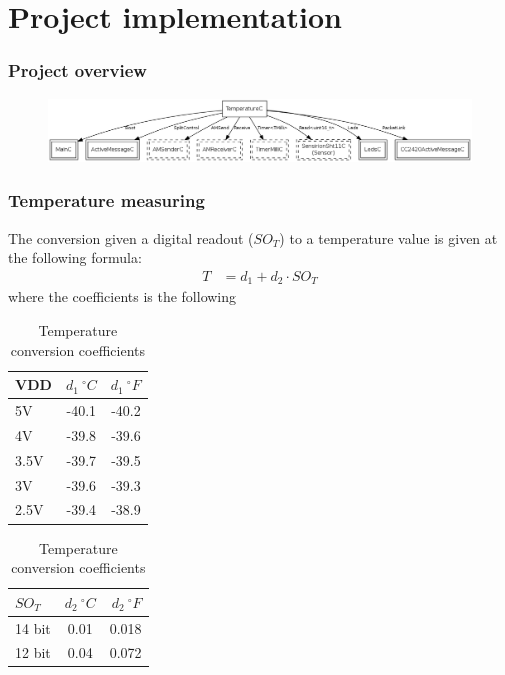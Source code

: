 \section{Project implementation}


\begin{frame}
\frametitle{Project overview}
\begin{figure}[htbp]
   \centering
   \includegraphics[width=\textwidth]{img/TemperatureAppC.png} 
\end{figure}

\end{frame}

\begin{frame}
\frametitle{Temperature measuring}
The conversion given a digital readout ($SO_{T}$) to a temperature value is given at the following formula:
\begin{align*}
	T &= d_{1} + d_{2} \cdot SO_{T}
\end{align*}
where the coefficients is the following
\begin{table}[ht]
\centering
\begin{tabular}{ | l | c | r | }
	\hline
	VDD & $d_{1} \ ^{\circ}  C$ & $d_{1} \ ^{\circ}  F$ \\
	\hline \hline
	5V & -40.1 & -40.2 \\
	\hline
	4V & -39.8 & -39.6 \\
	\hline
	3.5V & -39.7 & -39.5 \\
	\hline
	3V & -39.6 & -39.3 \\
	\hline
	2.5V & -39.4 & -38.9 \\
	\hline
\end{tabular}
\begin{tabular}{ | l | c | r | }
	\hline
	$SO_{T}$ & $d_{2}  \ ^{\circ}C$ & $d_{2} \ ^{\circ} F$ \\
	\hline \hline
	14 bit & 0.01 & 0.018 \\
	\hline
	12 bit & 0.04 & 0.072\\
	\hline
\end{tabular}
\caption{Temperature conversion coefficients}
\label{table:temperature}
\end{table}

\end{frame}

